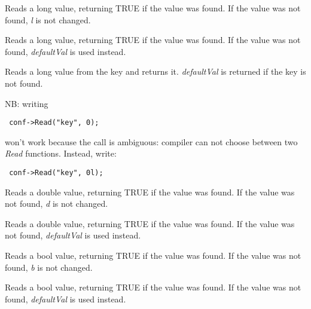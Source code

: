 Reads a long value, returning TRUE if the value was found. If the value was
not found, {\it l} is not changed.


Reads a long value, returning TRUE if the value was found. If the value was
not found, {\it defaultVal} is used instead.


Reads a long value from the key and returns it. {\it defaultVal} is returned
if the key is not found.

NB: writing

{\small \begin{verbatim} conf->Read("key", 0); \end{verbatim} }

won't work because the call is ambiguous: compiler can not choose between two
{\it Read} functions. Instead, write:

{\small \begin{verbatim} conf->Read("key", 0l); \end{verbatim} }


Reads a double value, returning TRUE if the value was found. If the value was
not found, {\it d} is not changed.


Reads a double value, returning TRUE if the value was found. If the value was
not found, {\it defaultVal} is used instead.


Reads a bool value, returning TRUE if the value was found. If the value was
not found, {\it b} is not changed.


Reads a bool value, returning TRUE if the value was found. If the value was
not found, {\it defaultVal} is used instead.

\label{wxconfigbaserenameentry}


